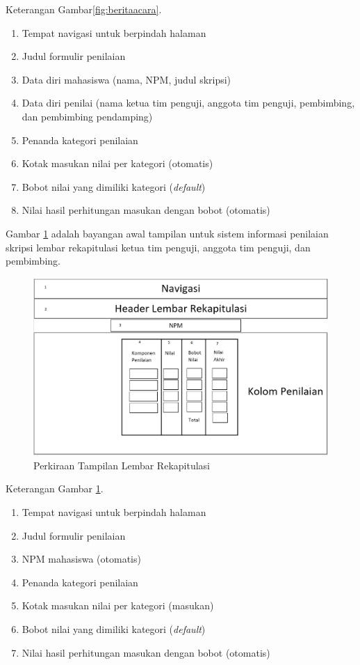 	Keterangan Gambar\ref{fig:beritaacara}.
	\begin{enumerate}
		\item Tempat navigasi untuk berpindah halaman
		\item Judul formulir penilaian
		\item Data diri mahasiswa (nama, NPM, judul skripsi)
		\item Data diri penilai (nama ketua tim penguji, anggota tim penguji, pembimbing, dan pembimbing pendamping)
		\item Penanda kategori penilaian
		\item Kotak masukan nilai per kategori (otomatis)
		\item Bobot nilai yang dimiliki kategori (\textit{default})
		\item Nilai hasil perhitungan masukan dengan bobot (otomatis)
	\end{enumerate}
	
	Gambar \ref{fig:rekapitulasi} adalah bayangan awal tampilan untuk sistem informasi penilaian skripsi lembar rekapitulasi ketua tim penguji, anggota tim penguji, dan pembimbing.
	\begin{figure}[H]
		\centering
		\includegraphics[scale=0.5]{Gambar/rekapitulasi}
		\caption{Perkiraan Tampilan Lembar Rekapitulasi}
		\label{fig:rekapitulasi}
	\end{figure}
Keterangan Gambar \ref{fig:rekapitulasi}.
\begin{enumerate}
	\item Tempat navigasi untuk berpindah halaman
	\item Judul formulir penilaian
	\item NPM mahasiswa (otomatis)
	\item Penanda kategori penilaian
	\item Kotak masukan nilai per kategori (masukan)
	\item Bobot nilai yang dimiliki kategori (\textit{default})
	\item Nilai hasil perhitungan masukan dengan bobot (otomatis)
\end{enumerate}